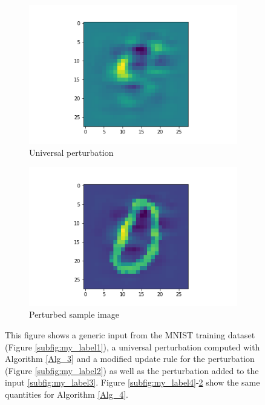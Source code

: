 \begin{figure}[!h]
\begin{subfigure}[c]{0.3\textwidth}
    \includegraphics[width=\textwidth]{attack_defence_perturbation.png}
    \caption{Universal perturbation}
    \label{subfig:my_label5}
    \end{subfigure}
    \begin{subfigure}[c]{0.3\textwidth}
    \includegraphics[width=\textwidth]{attack_defence_perturbed_image.png}
    \caption{Perturbed sample image}
    \label{subfig:my_label6}
    \end{subfigure}
    \caption{This figure shows a generic input from the MNIST training dataset (Figure \ref{subfig:my_label1}), a universal perturbation computed with Algorithm \ref{Alg_3} and a modified update rule for the perturbation (Figure \ref{subfig:my_label2}) as well as the perturbation added to the input \ref{subfig:my_label3}. Figure \ref{subfig:my_label4}-\ref{subfig:my_label6} show the same quantities for Algorithm \ref{Alg_4}.}
    \label{fig:sample_pertubations}
\end{figure}

